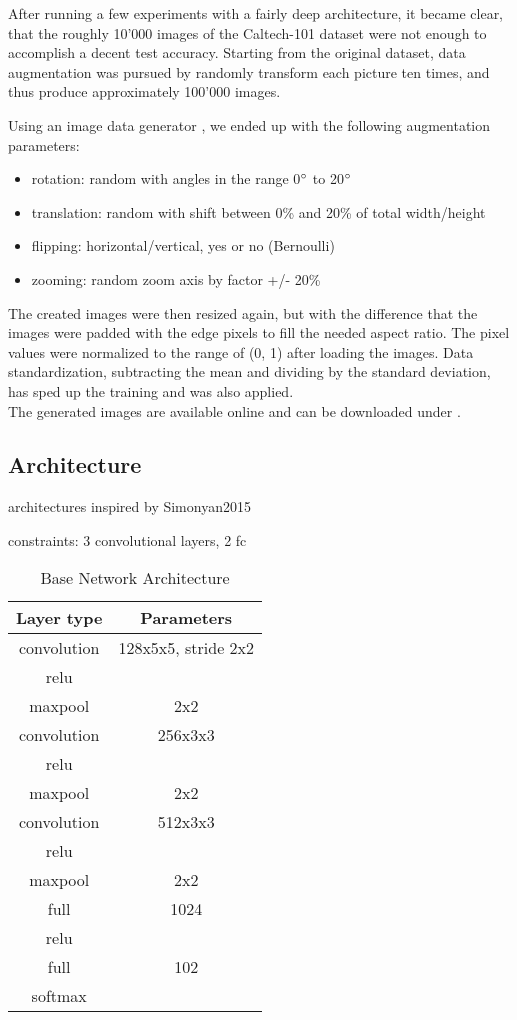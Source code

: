 \documentclass[a4paper, 11pt]{article}
\begin{document}
After running a few experiments with a fairly deep architecture, it became clear, that the roughly 10'000 images of the Caltech-101 dataset were not enough to accomplish a decent test accuracy.
Starting from the original dataset, data augmentation was pursued by randomly transform each picture ten times, and thus produce approximately 100'000 images.

Using an image data generator \cite{keras}, we ended up with the following augmentation parameters:
\begin{itemize}
	\item rotation: random with angles in the range 0$\degree$ to 20$\degree$
	\item translation: random with shift between 0\% and 20\% of total width/height
	\item flipping: horizontal/vertical, yes or no (Bernoulli)
	\item zooming: random zoom axis by factor +/- 20\%
\end{itemize}

The created images were then resized again, but with the difference that the images were padded with the edge pixels to fill the needed aspect ratio.
The pixel values were normalized to the range of (0, 1) after loading the images.
Data standardization, subtracting the mean and dividing by the standard deviation, has sped up the training and was also applied.\\

The generated images are available online and can be downloaded under \cite{UnternaehrerGenImg}.


\subsection{Architecture}
architectures inspired by Simonyan2015

constraints: 3 convolutional layers, 2 fc


\begin{table}[h!]
	\begin{center}
		\begin{tabular}{|c|c|}
			\hline Layer type & Parameters \\ 
			\hline convolution & 128x5x5, stride 2x2 \\ 
			\hline relu &\\
			\hline maxpool &  2x2\\ 
			\hline convolution & 256x3x3 \\ 
			\hline relu &\\
			\hline maxpool &  2x2\\ 
			\hline convolution & 512x3x3 \\ 
			\hline relu &\\
			\hline maxpool &  2x2\\ 
			\hline full &  1024 \\ 
			\hline relu &\\
			\hline full &  102 \\
			\hline softmax & \\
			\hline
		\end{tabular}
	\end{center}
	\caption{Base Network Architecture}
\end{table}
\end{document}
